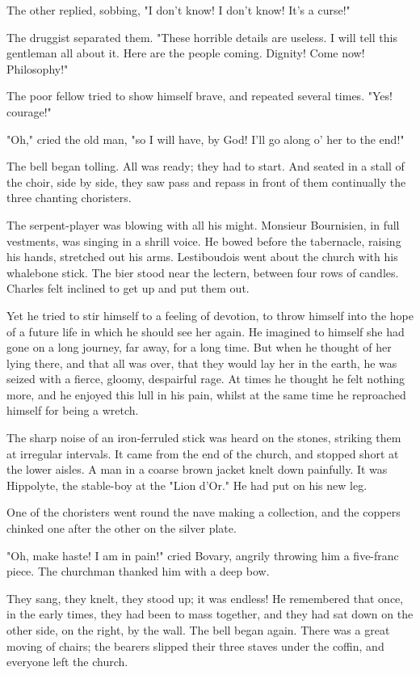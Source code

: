 \documentclass[11pt,twocolumn]{ltugboat}
\begin{document}
The other replied, sobbing, "I don't know! I don't know! It's a curse!"

The druggist separated them. "These horrible details are useless. I will
tell this gentleman all about it. Here are the people coming. Dignity!
Come now! Philosophy!"

The poor fellow tried to show himself brave, and repeated several times.
"Yes! courage!"

"Oh," cried the old man, "so I will have, by God! I'll go along o' her
to the end!"

The bell began tolling. All was ready; they had to start. And seated in
a stall of the choir, side by side, they saw pass and repass in front of
them continually the three chanting choristers.

The serpent-player was blowing with all his might. Monsieur Bournisien,
in full vestments, was singing in a shrill voice. He bowed before the
tabernacle, raising his hands, stretched out his arms. Lestiboudois
went about the church with his whalebone stick. The bier stood near the
lectern, between four rows of candles. Charles felt inclined to get up
and put them out.

Yet he tried to stir himself to a feeling of devotion, to throw himself
into the hope of a future life in which he should see her again. He
imagined to himself she had gone on a long journey, far away, for a long
time. But when he thought of her lying there, and that all was over,
that they would lay her in the earth, he was seized with a fierce,
gloomy, despairful rage. At times he thought he felt nothing more, and
he enjoyed this lull in his pain, whilst at the same time he reproached
himself for being a wretch.

The sharp noise of an iron-ferruled stick was heard on the stones,
striking them at irregular intervals. It came from the end of the
church, and stopped short at the lower aisles. A man in a coarse brown
jacket knelt down painfully. It was Hippolyte, the stable-boy at the
"Lion d'Or." He had put on his new leg.

One of the choristers went round the nave making a collection, and the
coppers chinked one after the other on the silver plate.

"Oh, make haste! I am in pain!" cried Bovary, angrily throwing him a
five-franc piece. The churchman thanked him with a deep bow.

They sang, they knelt, they stood up; it was endless! He remembered that
once, in the early times, they had been to mass together, and they had
sat down on the other side, on the right, by the wall. The bell began
again. There was a great moving of chairs; the bearers slipped their
three staves under the coffin, and everyone left the church.
\end{document}
